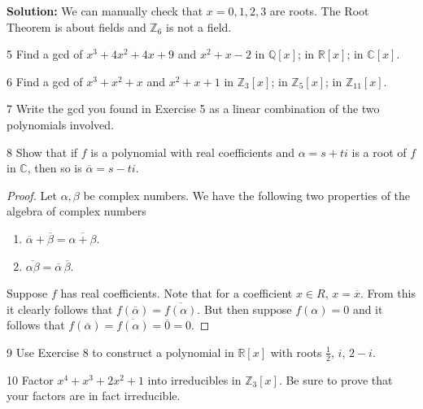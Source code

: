 \textbf{Solution:} We can manually check that $x = 0, 1, 2, 3$ are roots.
The Root Theorem is about fields and $\mathbb{Z}_6$ is not a field.

\begin{problem}{5}
    Find a gcd of $x^3 + 4x^2 + 4x + 9$ and $x^2 + x - 2$ in $\mathbb{Q}[x]$; in
    $\mathbb{R}[x]$; in $\mathbb{C}[x]$.
\end{problem}
\unsolved

\begin{problem}{6}
    Find a gcd of $x^3 + x^2 + x$ and $x^2 + x + 1$ in $\mathbb{Z}_3[x]$; in
    $\mathbb{Z}_5[x]$; in $\mathbb{Z}_{11}[x]$.
\end{problem}
\unsolved

\begin{problem}{7}
    Write the gcd you found in Exercise 5 as a linear combination of the two polynomials
    involved.
\end{problem}
\unsolved

\begin{problem}{8}
    Show that if $f$ is a polynomial with real coefficients and $\alpha = s + ti$
    is a root of $f$ in $\mathbb{C}$, then so is $\overline{\alpha} = s - ti$.
\end{problem}
\solved

\begin{proof}
    Let $\alpha, \beta$ be complex numbers.
    We have the following two properties of the algebra of complex numbers 
    \begin{enumerate}
        \item $\overline{\alpha} + \overline{\beta} = \overline{\alpha + \beta}$.
        \item $\overline{\alpha\beta} = \overline{\alpha}\,\overline{\beta}$.
    \end{enumerate}
    Suppose $f$ has real coefficients. 
    Note that for a coefficient $x \in R$, $x = \overline{x}$.
    From this it clearly follows that
    $f(\overline{\alpha}) = \overline{f(\alpha)}$.
    But then suppose $f(\alpha) = 0$ and it follows that
    $f(\overline{\alpha}) = \overline{f(\alpha)} = \overline{0} = 0$.
\end{proof}

\begin{problem}{9}
    Use Exercise 8 to construct a polynomial in $\mathbb{R}[x]$ with roots
    $\frac{1}{2}$, $i$, $2 - i$.
\end{problem}
\unsolved

\begin{problem}{10}
    Factor $x^4 + x^3 + 2x^2 + 1$ into irreducibles in $\mathbb{Z}_3[x]$. Be sure to prove
    that your factors are in fact irreducible.
\end{problem}
\unsolved

